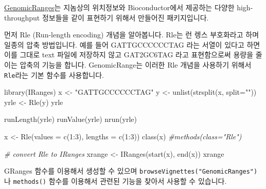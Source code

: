 \documentclass[
]{book}
\newenvironment{Shaded}{\begin{snugshade}}{\end{snugshade}}
\newcommand{\AttributeTok}[1]{\textcolor[rgb]{0.77,0.63,0.00}{#1}}
\newcommand{\CommentTok}[1]{\textcolor[rgb]{0.56,0.35,0.01}{\textit{#1}}}
\newcommand{\DecValTok}[1]{\textcolor[rgb]{0.00,0.00,0.81}{#1}}
\newcommand{\FunctionTok}[1]{\textcolor[rgb]{0.00,0.00,0.00}{#1}}
\newcommand{\NormalTok}[1]{#1}
\newcommand{\OtherTok}[1]{\textcolor[rgb]{0.56,0.35,0.01}{#1}}
\newcommand{\SpecialCharTok}[1]{\textcolor[rgb]{0.00,0.00,0.00}{#1}}
\newcommand{\StringTok}[1]{\textcolor[rgb]{0.31,0.60,0.02}{#1}}
\begin{document}
\href{https://bioconductor.org/packages/release/bioc/html/GenomicRanges.html}{GenomicRanges}는 지놈상의 위치정보와 Bioconductor에서 제공하는 다양한 high-throughput 정보들을 같이 표현하기 위해서 만들어진 패키지입니다.

먼저 Rle (Run-length encoding) 개념을 알아봅니다. Rle는 런 렝스 부호화라고 하며 일종의 압축 방법입니다. 예를 들어 GATTGCCCCCCTAG 라는 서열이 있다고 하면 이를 그대로 text 파일에 저장하지 않고 GAT2GC6TAG 라고 표현함으로써 용량을 줄이는 압축의 기능을 합니다. GenomicRange는 이러한 Rle 개념을 사용하기 위해서 \texttt{Rle}라는 기본 함수를 사용합니다.

\begin{Shaded}
\begin{Highlighting}[]
\FunctionTok{library}\NormalTok{(IRanges)}
\NormalTok{x }\OtherTok{\textless{}{-}} \StringTok{"GATTGCCCCCCTAG"}
\NormalTok{y }\OtherTok{\textless{}{-}} \FunctionTok{unlist}\NormalTok{(}\FunctionTok{strsplit}\NormalTok{(x, }\AttributeTok{split=}\StringTok{""}\NormalTok{))}
\NormalTok{yrle }\OtherTok{\textless{}{-}} \FunctionTok{Rle}\NormalTok{(y)}
\NormalTok{yrle}

\FunctionTok{runLength}\NormalTok{(yrle)}
\FunctionTok{runValue}\NormalTok{(yrle)}
\FunctionTok{nrun}\NormalTok{(yrle)}

\NormalTok{x }\OtherTok{\textless{}{-}} \FunctionTok{Rle}\NormalTok{(}\AttributeTok{values =} \FunctionTok{c}\NormalTok{(}\DecValTok{1}\SpecialCharTok{:}\DecValTok{3}\NormalTok{), }\AttributeTok{lengths =} \FunctionTok{c}\NormalTok{(}\DecValTok{1}\SpecialCharTok{:}\DecValTok{3}\NormalTok{))}
\FunctionTok{class}\NormalTok{(x)}
\CommentTok{\#methods(class="Rle")}

\CommentTok{\# convert Rle to IRanges}
\NormalTok{xrange }\OtherTok{\textless{}{-}} \FunctionTok{IRanges}\NormalTok{(}\FunctionTok{start}\NormalTok{(x), }\FunctionTok{end}\NormalTok{(x))}
\NormalTok{xrange}
\end{Highlighting}
\end{Shaded}

GRanges 함수를 이용해서 생성할 수 있으며 \texttt{browseVignettes("GenomicRanges")} 나 \texttt{methods()} 함수를 이용해서 관련된 기능을 찾아서 사용할 수 있습니다.
\end{document}
